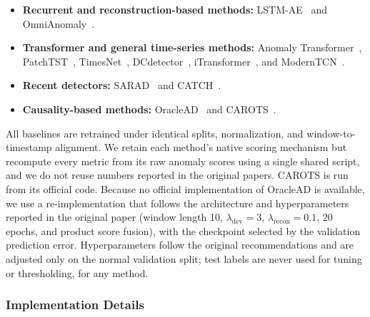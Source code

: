 \begin{itemize}
    \item \textbf{Recurrent and reconstruction-based methods:}
    LSTM-AE~\cite{malhotra2016lstm} and OmniAnomaly~\cite{su2019robust}.

    \item \textbf{Transformer and general time-series methods:}
    Anomaly Transformer~\cite{xu2022anomaly},
    PatchTST~\cite{nie2023patchtst},
    TimesNet~\cite{wu2023timesnet},
    DCdetector~\cite{yang2023dcdetector},
    iTransformer~\cite{liu2024itransformer}, and
    ModernTCN~\cite{luo2024moderntcn}.

    \item \textbf{Recent detectors:}
    SARAD~\cite{dai2024sarad} and
    CATCH~\cite{wu2024catch}.

    \item \textbf{Causality-based methods:}
    OracleAD~\cite{cho2025oraclead} and
    CAROTS~\cite{kim2025carots}.
\end{itemize}

All baselines are retrained under identical splits, normalization, and
window-to-timestamp alignment. We retain each method's native scoring
mechanism but recompute every metric from its raw anomaly scores using a
single shared script, and we do not reuse numbers reported in the original
papers. CAROTS is run from its official code. Because no official
implementation of OracleAD is available, we use a re-implementation that
follows the architecture and hyperparameters reported in the original paper
(window length 10, \(\lambda_{\mathrm{dev}}=3\), \(\lambda_{\mathrm{recon}}=0.1\),
20 epochs, and product score fusion), with the checkpoint selected by the
validation prediction error. Hyperparameters follow the original
recommendations and are adjusted only on the normal validation split; test
labels are never used for tuning or thresholding, for any method.

\subsubsection{Implementation Details}
\label{sec:implementation_details}

